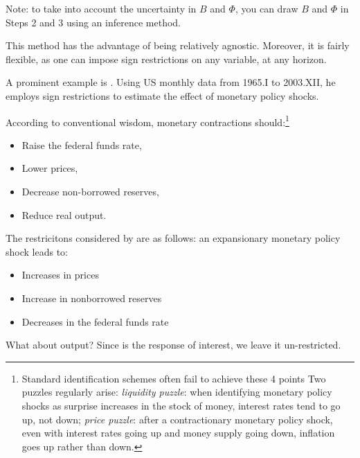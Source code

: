 \documentclass[
  12pt,
]{book}
\providecommand{\tightlist}{%
  \setlength{\itemsep}{0pt}\setlength{\parskip}{0pt}}
\theoremstyle{definition}
\theoremstyle{definition}
\theoremstyle{definition}
\theoremstyle{definition}
\theoremstyle{remark}
\begin{document}
Note: to take into account the uncertainty in \(B\) and \(\Phi\), you can draw \(B\) and \(\Phi\) in Steps 2 and 3 using an inference method.

This method has the advantage of being relatively agnostic. Moreover, it is fairly flexible, as one can impose sign restrictions on any variable, at any horizon.

A prominent example is \citet{Uhlig_2005}. Using US monthly data from 1965.I to 2003.XII, he employs sign restrictions to estimate the effect of monetary policy shocks.

According to conventional wisdom, monetary contractions should:\footnote{Standard identification schemes often fail to achieve these 4 points Two puzzles regularly arise: \emph{liquidity puzzle}: when identifying monetary policy shocks as surprise increases in the stock of money, interest rates tend to go up, not down; \emph{price puzzle}: after a contractionary monetary policy shock, even with interest rates going up and money supply going down, inflation goes up rather than down.}

\begin{itemize}
\tightlist
\item
  Raise the federal funds rate,
\item
  Lower prices,
\item
  Decrease non-borrowed reserves,
\item
  Reduce real output.
\end{itemize}

The restricitons considered by \citet{Uhlig_2005} are as follows: an expansionary monetary policy shock leads to:

\begin{itemize}
\tightlist
\item
  Increases in prices
\item
  Increase in nonborrowed reserves
\item
  Decreases in the federal funds rate
\end{itemize}

What about output? Since is the response of interest, we leave it un-restricted.
\end{document}
